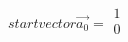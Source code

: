 \documentclass[preview]{standalone}
\begin{document}
\begin{align*}
start vector \vec{a_0} = {\begin{array}{cc} 1 \\ 0 \\ \end{array}}
\end{align*}
\end{document}
